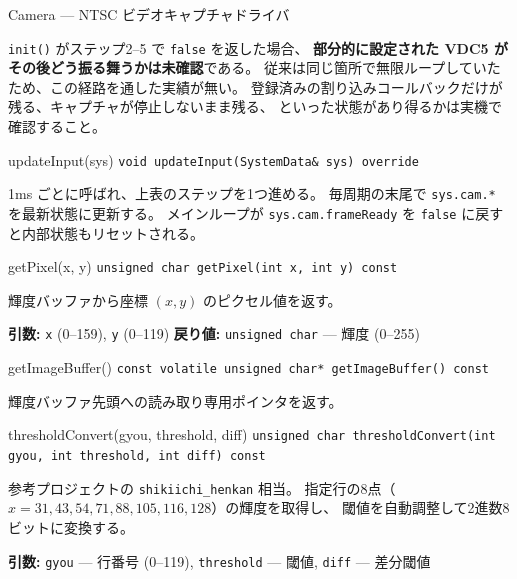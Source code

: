 \documentclass[a4paper,11pt,dvipdfmx]{jsarticle}
\begin{document}
\begin{apibox}{Camera --- NTSC ビデオキャプチャドライバ}
\begin{cautionbox}
\texttt{init()} がステップ2--5 で \texttt{false} を返した場合、
\textbf{部分的に設定された VDC5 がその後どう振る舞うかは未確認}である。
従来は同じ箇所で無限ループしていたため、この経路を通した実績が無い。
登録済みの割り込みコールバックだけが残る、キャプチャが停止しないまま残る、
といった状態があり得るかは実機で確認すること。
\end{cautionbox}

\begin{funcblock}{updateInput(sys)}
\texttt{void updateInput(SystemData\& sys) override}

\vspace{1.5mm}
1ms ごとに呼ばれ、上表のステップを1つ進める。
毎周期の末尾で \texttt{sys.cam.*} を最新状態に更新する。
メインループが \texttt{sys.cam.frameReady} を \texttt{false} に戻すと内部状態もリセットされる。
\end{funcblock}

\begin{funcblock}{getPixel(x, y)}
\texttt{unsigned char getPixel(int x, int y) const}

\vspace{1.5mm}
輝度バッファから座標 $(x, y)$ のピクセル値を返す。

\vspace{1.5mm}
\textbf{引数:} \texttt{x} (0--159), \texttt{y} (0--119)\quad
\textbf{戻り値:} \texttt{unsigned char} --- 輝度 (0--255)
\end{funcblock}

\begin{funcblock}{getImageBuffer()}
\texttt{const volatile unsigned char* getImageBuffer() const}

\vspace{1.5mm}
輝度バッファ先頭への読み取り専用ポインタを返す。
\end{funcblock}

\begin{funcblock}{thresholdConvert(gyou, threshold, diff)}
\texttt{unsigned char thresholdConvert(int gyou, int threshold, int diff) const}

\vspace{1.5mm}
参考プロジェクトの \texttt{shikiichi\_henkan} 相当。
指定行の8点（$x = 31, 43, 54, 71, 88, 105, 116, 128$）の輝度を取得し、
閾値を自動調整して2進数8ビットに変換する。

\vspace{1.5mm}
\textbf{引数:} \texttt{gyou} --- 行番号 (0--119), \texttt{threshold} --- 閾値, \texttt{diff} --- 差分閾値


\end{funcblock}
\end{apibox}
\end{document}
